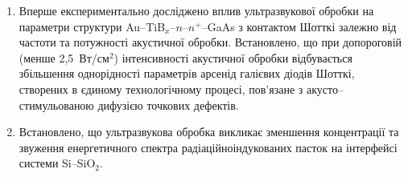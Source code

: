 \begin{enumerate}[leftmargin=0cm,itemindent=3em]
\item Вперше експериментально досліджено вплив ультразвукової обробки на параметри структури Au--TiB$_x$--$n$--$n^+$--GaAs з контактом Шотткі
 залежно від частоти та потужності акустичної обробки.
 Встановлено, що при допороговій (менше 2,5~Вт/см$^2$) інтенсивності акустичної обробки відбувається збільшення однорідності параметрів арсенід галієвих діодів Шотткі, створених в єдиному технологічному процесі, пов'язане з
 акусто--стимульованою дифузією точкових дефектів.



\item Встановлено, що ультразвукова обробка викликає зменшення концентрації та звуження енергетичного спектра радіаційноіндукованих пасток  на інтерфейсі системи   Si--SiO$_2$.

\end{enumerate}

